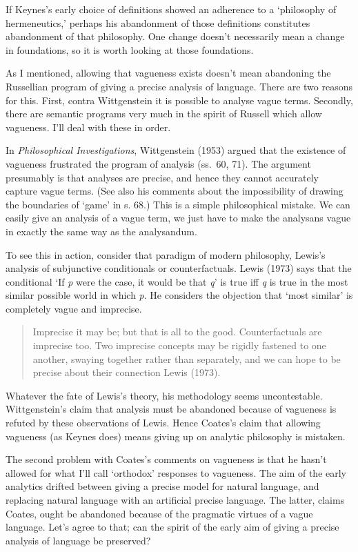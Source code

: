 \documentclass[noflushend]{philosophersimprint}
\begin{document}
If Keynes's early choice of definitions showed an adherence to a
`philosophy of hermeneutics,' perhaps his abandonment of those
definitions constitutes abandonment of that philosophy. One change
doesn't necessarily mean a change in foundations, so it is worth looking
at those foundations.

As I mentioned, allowing that vagueness exists doesn't mean abandoning
the Russellian program of giving a precise analysis of language. There
are two reasons for this. First, contra Wittgenstein it is possible to
analyse vague terms. Secondly, there are semantic programs very much in
the spirit of Russell which allow vagueness. I'll deal with these in
order.

In \emph{Philosophical Investigations}, Wittgenstein (1953) argued that
the existence of vagueness frustrated the program of analysis (ss.~60,
71). The argument presumably is that analyses are precise, and hence
they cannot accurately capture vague terms. (See also his comments about
the impossibility of drawing the boundaries of `game' in s. 68.) This is
a simple philosophical mistake. We can easily give an analysis of a
vague term, we just have to make the analysans vague in exactly the same
way as the analysandum.

To see this in action, consider that paradigm of modern philosophy,
Lewis's analysis of subjunctive conditionals or counterfactuals. Lewis
(1973) says that the conditional `If \emph{p} were the case, it would be
that \emph{q}' is true iff \emph{q} is true in the most similar possible
world in which \emph{p}. He considers the objection that `most similar'
is completely vague and imprecise.

\begin{quote}
Imprecise it may be; but that is all to the good. Counterfactuals are
imprecise too. Two imprecise concepts may be rigidly fastened to one
another, swaying together rather than separately, and we can hope to be
precise about their connection Lewis (1973).
\end{quote}

Whatever the fate of Lewis's theory, his methodology seems
uncontestable. Wittgenstein's claim that analysis must be abandoned
because of vagueness is refuted by these observations of Lewis. Hence
Coates's claim that allowing vagueness (as Keynes does) means giving up
on analytic philosophy is mistaken.

The second problem with Coates's comments on vagueness is that he hasn't
allowed for what I'll call `orthodox' responses to vagueness. The aim of
the early analytics drifted between giving a precise model for natural
language, and replacing natural language with an artificial precise
language. The latter, claims Coates, ought be abandoned because of the
pragmatic virtues of a vague language. Let's agree to that; can the
spirit of the early aim of giving a precise analysis of language be
preserved?
\end{document}

